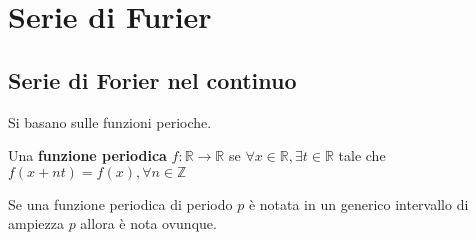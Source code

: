 \chapter{Serie di Furier}

\section{Serie di Forier nel continuo}
Si basano sulle funzioni perioche. 

\begin{definizione} 
    Una \textbf{funzione periodica} $f:\mathbb{R}\to \mathbb{R}$ se 
    $\forall x\in \mathbb{R}, \exists t \in \mathbb{R}$ tale che $f(x+nt) = f(x),
    \forall n\in \mathbb{Z}$ 
\end{definizione}

\begin{nota}
    Se una funzione periodica di periodo $p$ è notata in un generico intervallo
    di ampiezza $p$ allora è nota ovunque.
\end{nota}

